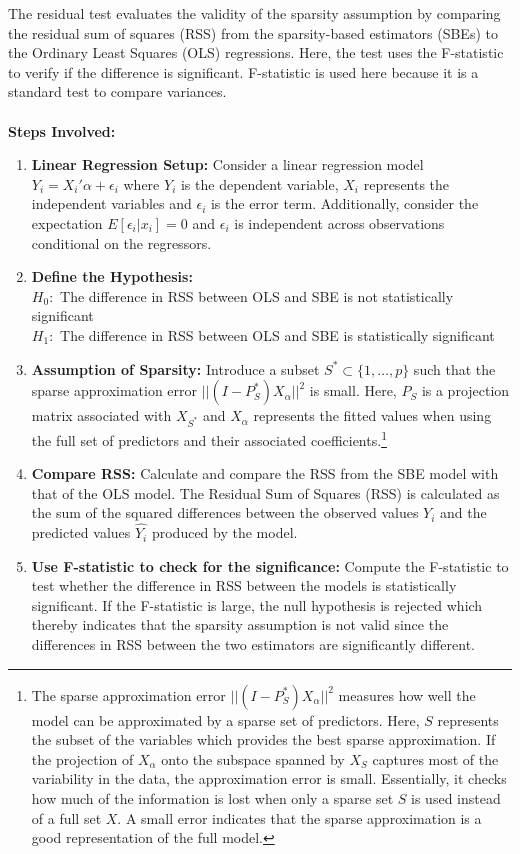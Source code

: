 The residual test evaluates the validity of the sparsity assumption by comparing the residual sum of squares (RSS) from the sparsity-based estimators (SBEs) to the Ordinary Least Squares (OLS) regressions. Here, the test uses the F-statistic to verify if the difference is significant. F-statistic is used here because it is a standard test to compare variances.  \\
\\
\textbf{Steps Involved:}
\begin{enumerate}
    \item \textbf{Linear Regression Setup:} Consider a linear regression model $Y_i = X_i{\prime}\alpha + \epsilon_i$ where $Y_i$ is the dependent variable, $X_i$ represents the independent variables and $\epsilon_i$ is the error term. Additionally, consider the expectation $E[\epsilon_i | x_i] = 0$ and $\epsilon_i$ is independent across observations conditional on the regressors. 
    \item \textbf{Define the Hypothesis:} \\
    $H_0:$ The difference in RSS between OLS and SBE is not statistically significant\\
    $H_1:$ The difference in RSS between OLS and SBE is statistically significant
    \item \textbf{Assumption of Sparsity:} Introduce a subset $S^* \subset \{1, \dots, p\}$ such that the sparse approximation error $||(I - P_{S}^*)X_\alpha||^2$ is small. Here, $P_S$ is a projection matrix associated with $X_{S^*}$ and $X_\alpha$ represents the fitted values when using the full set of predictors and their associated coefficients.\footnote{The sparse approximation error $||(I - P_{S}^*)X_\alpha||^2$ measures how well the model can be approximated by a sparse set of predictors. Here, $S$ represents the subset of the variables which provides the best sparse approximation. If the projection of $X_\alpha$ onto the subspace spanned by $X_S$ captures most of the variability in the data, the approximation error is small. Essentially, it checks how much of the information is lost when only a sparse set $S$ is used instead of a full set $X$. A small error indicates that the sparse approximation is a good representation of the full model.}
    \item \textbf{Compare RSS:} Calculate and compare the RSS from the SBE model with that of the OLS model. The Residual Sum of Squares (RSS) is calculated as the sum of the squared differences between the observed values $Y_i$ and the predicted values $\hat{Y_i}$ produced by the model. 
    \item \textbf{Use F-statistic to check for the significance:} Compute the F-statistic to test whether the difference in RSS between the models is statistically significant.
    If the F-statistic is large, the null hypothesis is rejected which thereby indicates that the sparsity assumption is not valid since the differences in RSS between the two estimators are significantly different. 
    

\end{enumerate}
